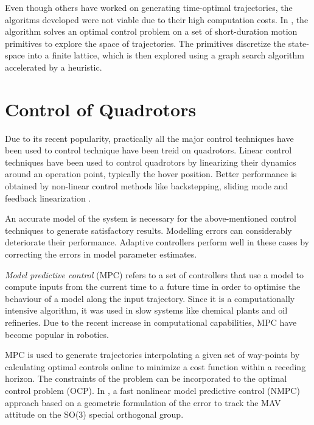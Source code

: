 Even though others have worked on generating time-optimal trajectories, the algoritms developed were not viable due to their high computation costs. In \cite{kumar2017search}, the algorithm solves an optimal control problem on a set of short-duration motion primitives to explore the space of trajectories. The primitives discretize the state-space into a finite lattice, which is then explored using a graph search algorithm accelerated by a heuristic. 

\section{Control of Quadrotors}
\label{sec:control_quadrotors}
Due to its recent popularity, practically all the major control techniques have been used to control technique have been treid on quadrotors. Linear control techniques \cite{seigwart2004pid} have been used to control quadrotors by linearizing their dynamics around an operation point, typically the hover position. Better performance is obtained by non-linear control methods like backstepping, sliding mode \cite{seigwart2005backstepping} and feedback linearization \cite{lewis2009dynamic}.

An accurate model of the system is necessary for the above-mentioned control techniques to generate satisfactory results. Modelling errors can considerably deteriorate their performance. Adaptive controllers \cite{kumar2011design} perform well in these cases by correcting the errors in model parameter estimates.

\textit{Model predictive control} (MPC) refers to a set of controllers that use a model to compute inputs from the current time to a future time in order to optimise the behaviour of a model along the input trajectory. Since it is a computationally intensive algorithm, it was used in slow systems like chemical plants and oil refineries. Due to the recent increase in computational capabilities, MPC have become popular in robotics. 

MPC is used to generate trajectories interpolating a given set of way-points \cite{singh2001trajectory} by calculating optimal controls online to minimize a cost function within a receding horizon. The constraints of the problem can be incorporated to the optimal control problem (OCP). In \cite{kamel2015fast}, a fast nonlinear model predictive control (NMPC) approach based on a geometric formulation of the error to track the MAV attitude on the SO(3) special orthogonal group. 

